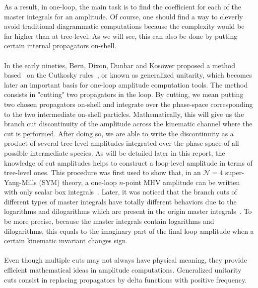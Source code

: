 As a result, in one-loop, the main task is to find the coefficient for each of the master integrals for an amplitude.
Of course, one should find a way to cleverly avoid traditional diagrammatic computations because the complexity would be far higher than at tree-level.
As we will see, this can also be done by putting certain internal propagators on-shell.
\\\\
In the early nineties, Bern, Dixon, Dunbar and Kosower proposed a method based~\cite{Bern:1994zx} on the Cutkosky rules~\cite{doi:10.1063/1.1703676}, or known as generalized unitarity, 
which becomes later an important basis for one-loop amplitude computation tools.
The method consists in "cutting" two propagators in the loop.
By cutting, we mean putting two chosen propagators on-shell and integrate over the phase-space corresponding to the two intermediate on-shell particles.
Mathematically, this will give us the branch cut discontinuity of the amplitude across the kinematic channel where the cut is performed. 
After doing so, we are able to write the discontinuity as a product of several tree-level amplitudes integrated over the phase-space of all possible intermediate species.
As will be detailed later in this report, the knowledge of cut amplitudes helps to construct a loop-level amplitude in terms of tree-level ones. 
This procedure was first used to show that, in an $\mathcal{N}=4$ super-Yang-Mills (SYM) theory, a one-loop $n$-point MHV amplitude can be written with only scalar box integrals~\cite{Bern:1994zx}.
Later, it was noticed that the branch cuts of different types of master integrals have totally different behaviors due to the logarithms and dilogarithms which are present in the origin master integrals~\cite{Bern:1994cg}. 
To be more precise, because the master integrals contain logarithms and dilogarithms, this equals to the imaginary part of the final loop amplitude when a certain kinematic invariant changes sign.
\\\\
Even though multiple cuts may not always have physical meaning, they provide efficient mathematical ideas in amplitude computations.
Generalized unitarity cuts consist in replacing propagators by delta functions with positive frequency.
